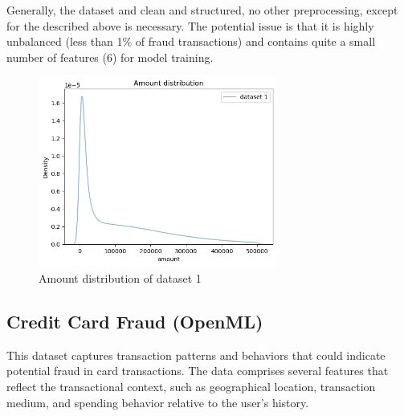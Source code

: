 \documentclass[12pt,a4paper, hidelinks]{article}
\begin{document}
Generally, the dataset and clean and structured, no other preprocessing, except for the described above is necessary. The potential issue is that it is highly unbalanced (less than 1\% of fraud transactions) and contains quite a small number of features (6) for model training. 

\begin{figure}[h!]
    \centering
    \includegraphics[width=0.7\textwidth]{images/amount1.png}
    \caption{Amount distribution of dataset 1}
    \label{fig:amount1}
\end{figure}


\subsection{Credit Card Fraud (OpenML)}

This dataset captures transaction patterns and behaviors that could indicate potential fraud in card transactions. The data comprises several features that reflect the transactional context, such as geographical location, transaction medium, and spending behavior relative to the user's history.
\end{document}
